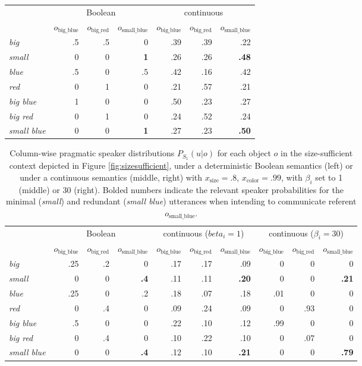 \documentclass[11pt]{article}
\newcommand{\figref}[1]{Figure \ref{#1}}
\begin{document}
\begin{table}
\begin{tabular}{l r r r r r r}
\toprule
& \multicolumn{3}{c}{Boolean} & \multicolumn{3}{c}{continuous}\\ 
& $o_{\textrm{big\_blue}}$ & $o_{\textrm{big\_red}}$ & $o_{\textrm{small\_blue}}$
& $o_{\textrm{big\_blue}}$ & $o_{\textrm{big\_red}}$ & $o_{\textrm{small\_blue}}$ \\
\midrule
\emph{big} & .5 & .5 & 0 & .39 & .39 & .22 \\
\emph{small} & 0 & 0 & \textbf{1} & .26 & .26 & \textbf{.48} \\
\emph{blue} & .5 & 0 & .5 & .42 & .16 & .42 \\
\emph{red} & 0 & 1 & 0 & .21 & .57 & .21 \\
\emph{big blue}  & 1 & 0 & 0 & .50 & .23 & .27 \\
\emph{big red}  & 0 & 1 & 0 & .24 & .52 & .24 \\
\emph{small blue} & 0 & 0 & \textbf{1} & .27 & .23 & \textbf{.50} \\
\bottomrule
\end{tabular}
\label{tab:detliteral}
\end{table}

\begin{table}
\caption{Column-wise pragmatic speaker distributions $P_{S_1}(u | o)$ for each object $o$ in the size-sufficient context depicted in \figref{fig:sizesufficient}, under a deterministic Boolean semantics (left) or under a continuous semantics (middle, right) with  $x_{\text{size}} = .8$, $x_{\text{color}} = .99$, with $\beta_i$ set to 1 (middle) or 30 (right). Bolded numbers indicate the relevant speaker probabilities for the minimal (\emph{small}) and redundant (\emph{small blue}) utterances when intending to communicate referent $o_{\text{small\_blue}}$.}
\small
\begin{tabular}{l r r r r r r r r r}
\toprule
& \multicolumn{3}{c}{Boolean} & \multicolumn{3}{c}{continuous ($beta_i = 1$)} & \multicolumn{3}{c}{continuous ($\beta_i = 30$)}\\ 
& $o_{\textrm{big\_blue}}$ & $o_{\textrm{big\_red}}$ & $o_{\textrm{small\_blue}}$
& $o_{\textrm{big\_blue}}$ & $o_{\textrm{big\_red}}$ & $o_{\textrm{small\_blue}}$
& $o_{\textrm{big\_blue}}$ & $o_{\textrm{big\_red}}$ & $o_{\textrm{small\_blue}}$ \\
\midrule
\emph{big} & .25 & .2 & 0 & .17 & .17 & .09 & 0 & 0 & 0 \\
\emph{small} & 0 & 0 & \textbf{.4} & .11  & .11 & \textbf{.20} & 0 & 0 & \textbf{.21} \\
\emph{blue} & .25 & 0 & .2 & .18 & .07 & .18 & .01 & 0 & 0 \\
\emph{red} & 0 & .4 & 0 & .09 & .24 & .09 & 0 & .93 & 0 \\
\emph{big blue}  & .5 & 0 & 0 & .22 & .10 & .12 & .99 & 0 & 0 \\
\emph{big red}  & 0 & .4 & 0 & .10 & .22 & .10 & 0 & .07 & 0 \\
\emph{small blue} & 0 & 0 & \textbf{.4} & .12 & .10 & \textbf{.21} & 0 & 0 & \textbf{.79} \\
\bottomrule
\end{tabular}
\label{tab:speaker}
\end{table}
\end{document}
